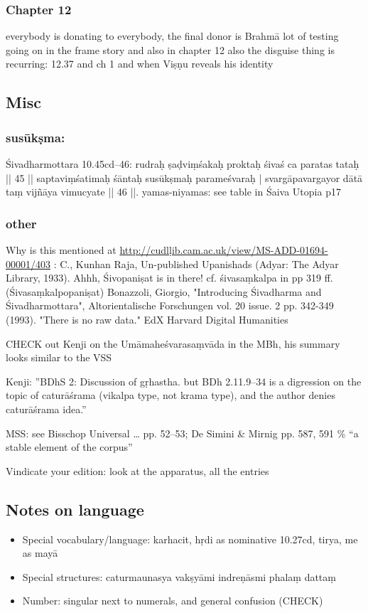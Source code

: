 \documentclass[11pt]{article}
\begin{document}
\subsubsection{Chapter 12}
\label{sec:orgf298b3e}
everybody is donating to everybody, 
the final donor is Brahmā
lot of testing going on in the frame story and also
in chapter 12
also the disguise thing is recurring: 12.37 and ch 1 and
when Viṣṇu reveals his identity
\subsection{Misc}
\label{sec:orgdf4797a}
\subsubsection{susūkṣma:}
\label{sec:orgd27f794}
Śivadharmottara 10.45cd--46: rudraḥ ṣaḍviṃśakaḥ proktaḥ śivaś ca paratas tataḥ || 45 || saptaviṃśatimaḥ śāntaḥ susūkṣmaḥ parameśvaraḥ | svargāpavargayor dātā taṃ vijñāya vimucyate || 46 ||.
yamas-niyamas: see table in Śaiva Utopia p17
\subsubsection{other}
\label{sec:org0efcb93}
Why is this mentioned at
\url{http://cudlḷib.cam.ac.uk/view/MS-ADD-01694-00001/403} :
C., Kunhan Raja, Un-published Upanishads (Adyar: The Adyar Library, 1933).
Ahhh, Śivopaniṣat is in there!
cf. śivasaṃkalpa in pp 319 ff. (Śivasaṃkalpopaniṣat)
Bonazzoli, Giorgio, "Introducing Śivadharma and Śivadharmottara", Altorientalische Forschungen vol. 20 issue. 2 pp. 342-349 (1993).
"There is no raw data." EdX Harvard Digital Humanities

CHECK out Kenji on the Umāmaheśvarasaṃvāda in the MBh, his summary looks similar to the VSS

Kenji:
''BDhS 2: Discussion of gṛhastha. but BDh 2.11.9--34 is a digression on the topic of caturāśrama (vikalpa
type, not krama type), and the author denies caturāśrama idea.''

MSS: see Bisschop Universal \ldots{} pp. 52--53; De Simini \& Mirnig pp. 587, 591
\% ``a stable element of the corpus''

Vindicate your edition: look at the apparatus, all the \Ed entries
\subsection{Notes on language}
\label{sec:org0db1d18}
\begin{itemize}
\item Special vocabulary/language: karhacit, hṛdi as nominative 10.27cd, tirya, me as mayā
\item Special structures: 
caturmaunasya vakṣyāmi
indreṇāsmi phalaṃ dattaṃ
\item Number: singular next to numerals, and general confusion (CHECK)
\end{itemize}
\end{document}
